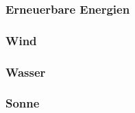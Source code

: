 \subsubsection{Erneuerbare Energien}

\subsubsection*{Wind}
\subsubsection*{Wasser}
\subsubsection*{Sonne}
